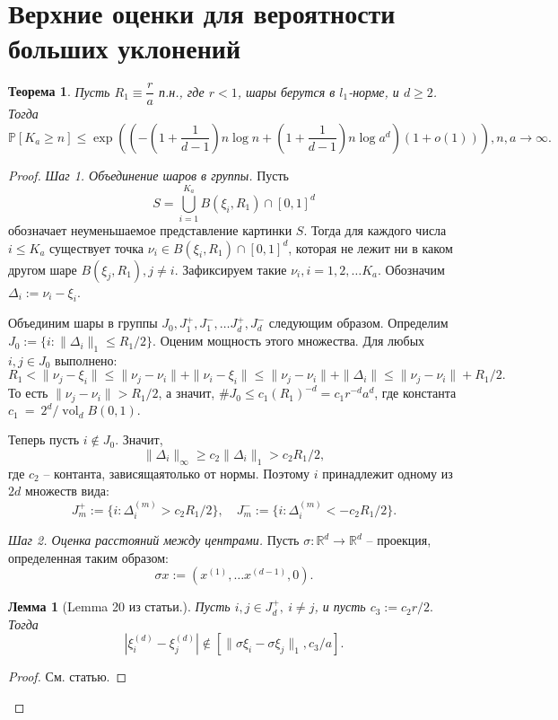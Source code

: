 \documentclass[12pt]{article}
\theoremstyle{plain}
\newtheorem{thm}{Теорема} %
\newtheorem{lm}{Лемма}
\theoremstyle{definition}
\theoremstyle{remark}
\def\geq{\geqslant}
\def\leq{\leqslant}
\DeclareMathOperator{\vol}{vol}
\newcommand{\R}{\mathbb{R}}
\newcommand{\PP}{\mathbb{P}}
\begin{document}
\section{Верхние оценки для вероятности больших уклонений}

\begin{thm}
Пусть $R_1\equiv \dfrac{r}{a}$ п.н., где $r<1$, шары берутся в $l_1$-норме, и $d\geq 2$. 
Тогда $$\PP[K_a \geq n] \leq \exp \left(\left(-\left(1+\dfrac{1}{d-1}\right)n\log n + \left(1 + \dfrac{1}{d-1}\right)n\log a^d \right)(1 + o(1))\right), n, a\to \infty.$$
\end{thm}{}



\begin{proof}
{\it Шаг 1. Объединение шаров в группы.} Пусть $$S = \bigcup_{i=1}^{K_a} B(\xi_i, R_1) \cap [0,1]^d$$ обозначает неуменьшаемое представление картинки $S$. Тогда для каждого числа $i\leq K_a$ существует точка $\nu_i\in B(\xi_i, R_1) \cap [0,1]^d$, которая не лежит ни в каком другом шаре $B(\xi_j, R_1), j \not= i$. Зафиксируем такие $\nu_i, i = 1, 2, \ldots K_a$. Обозначим $\Delta_i := \nu_i - \xi_i$.

Объединим шары в группы $J_0, J_1^+, J_1^-, \ldots J_d^+, J_d^-$ следующим образом. Определим $J_0 := \{i \colon \|\Delta_i\|_1 \leq R_1/2\}$. Оценим мощность этого множества. Для любых $i, j \in J_0$ выполнено:
$$R_1 < \|\nu_j - \xi_i\| \leq \|\nu_j - \nu_i\| + \|\nu_i - \xi_i\| \leq 
\|\nu_j - \nu_i\| + \|\Delta_i\| \leq \|\nu_j - \nu_i\| + R_1/2.$$
То есть $\|\nu_j-\nu_i\|> R_1/2$, а значит, $\#J_0 \leq c_1(R_1)^{-d} = c_1r^{-d}a^d$, где константа $c_1~=~2^d/\vol_d B(0,1).$

Теперь пусть $i\not\in J_0$. Значит, $$\|\Delta_i\|_\infty \geq c_2\|\Delta_i\|_1 > c_2R_1/2,$$ где $c_2$ -- контанта, зависящаятолько от нормы. Поэтому $i$ принадлежит одному из $2d$ множеств вида: $$J_m^+ := \{i\colon \Delta_i^{(m)} > c_2R_1/2\}, \quad J_m^- := \{i\colon \Delta_i^{(m)} < - c_2R_1/2\}.$$

{\it Шаг 2. Оценка расстояний между центрами.} Пусть $\sigma \colon \R^d \to \R^d$ -- проекция, определенная таким образом: $$\sigma x := (x^{(1)}, \ldots x^{(d-1)}, 0).$$ 

\begin{lm}[Lemma 20 из статьи.]
Пусть $i, j\in J_d^+, \ i\not= j$, и пусть $c_3 := c_2 r/2.$ Тогда $$|\xi_i^{(d)} - \xi_j^{(d)}| \not\in [\|\sigma\xi_i - \sigma\xi_j\|_1, c_3/a].$$
\end{lm}{}
\begin{proof}
См. статью.
\end{proof}{}


\end{proof}
\end{document}
